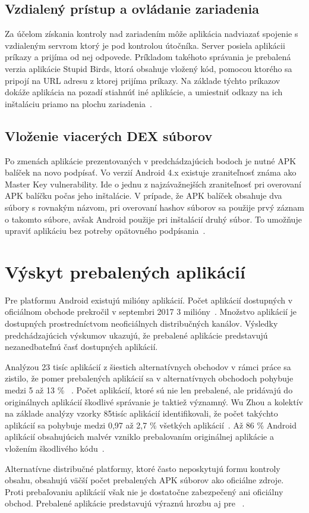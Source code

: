 \subsection*{Vzdialený prístup a ovládanie zariadenia}
Za účelom získania kontroly nad zariadením môže aplikácia nadviazať spojenie s vzdialeným servrom ktorý je pod kontrolou útočníka. Server posiela aplikácii príkazy a prijíma od nej odpovede. Príkladom takéhoto správania je prebalená verzia aplikácie Stupid Birds, ktorá obsahuje vložený kód, pomocou ktorého sa pripojí na URL adresu z ktorej prijíma príkazy. Na základe týchto príkazov dokáže aplikácia na pozadí stiahnúť iné aplikácie, a umiestniť odkazy na ich inštaláciu priamo na plochu zariadenia~\cite{fakeapps}. 

\subsection*{Vloženie viacerých DEX súborov}
Po zmenách aplikácie prezentovaných v predchádzajúcich bodoch je nutné APK balíček na novo podpísať. Vo verzií Android 4.x existuje zraniteľnosť známa ako Master Key vulnerability. Ide o jednu z najzávažnejších zraniteľnosť pri overovaní APK balíčku počas jeho inštalácie. V prípade, že APK balíček obsahuje dva súbory s rovnakým názvom, pri overovaní hashov súborov sa použije prvý záznam o takomto súbore, avšak Android použije pri inštalácií druhý súbor. To umožňuje upraviť aplikáciu bez potreby opätovného podpísania~\cite{c2gYRVCI9leJhfOJ}. 

\section{Výskyt prebalených aplikácií}
Pre platformu Android existujú milióny aplikácií. Počet aplikácií dostupných v oficiálnom obchode  prekročil v septembri 2017 3 milióny~\cite{Statista}. Množstvo aplikácií je dostupných prostredníctvom neoficiálnych distribučných kanálov.  Výsledky predchádzajúcich výskumov ukazujú, že prebalené aplikácie predstavujú nezanedbateľnú časť dostupných aplikácií.

Analýzou 23 tisíc aplikácií z šiestich alternatívnych obchodov v rámci práce  sa zistilo, že pomer prebalených aplikácií sa v alternatívnych obchodoch pohybuje medzi 5 až 13 \% ~\cite{DetectingRepackagedZhou}.
Počet aplikácií, ktoré sú nie len prebalené, ale pridávajú do originálnych aplikácií škodlivé správanie je taktiež významný. Wu Zhou a kolektív na základe analýzy vzorky 85tisíc aplikácií identifikovali, že počet takýchto aplikácií sa pohybuje medzi 0,97 až 2,7 \% všetkých aplikácií~\cite{Zhou2013}.
Až 86 \% Android aplikácií obsahujúcich malvér vzniklo prebalovaním originálnej aplikácie a vložením škodlivého kódu~\cite{androidThreats}.

Alternatívne distribučné platformy, ktoré často neposkytujú formu kontroly obsahu, obsahujú väčší počet prebalených APK súborov ako oficiálne zdroje. Proti prebaľovaniu aplikácií však nie je dostatočne zabezpečený ani oficiálny obchod. Prebalené aplikácie predstavujú výraznú hrozbu aj pre ~\cite{Zhauniarovich2013}. 
